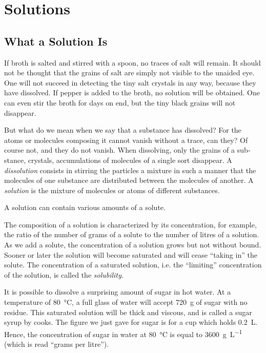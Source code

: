 

\cleardoublepage
\chapter{Solutions}
\label{ch-05}

\section{What a Solution Is}

If broth is salted and stirred with a spoon, no traces of salt will remain. It should not be thought that the grains of salt are simply not visible to the unaided eye. One will not succeed in detecting the tiny salt crystals in any way, because they have dissolved. If pepper is added to the broth, no solution will be obtained. One can even stir the broth for days on end, but the tiny black grains will not disappear.

But what do we mean when we say that a substance has dissolved? For the atoms or molecules composing it cannot vanish without a trace, can they? Of course not, and they do not vanish. When dissolving, only the grains of a sub­stance, crystals, accumulations of molecules of a single sort disappear. A \emph{dissolution} consists in stirring the particles a mixture in such a manner that the molecules of one substance are distributed between the molecules of another. A \emph{solution} is the mixture of molecules or atoms
of different substances.

A solution can contain various amounts of a solute.

The composition of a solution is characterized by its concentration, for example, the ratio of the number of grams of a solute to the number of litres of a solution.
As we add a solute, the concentration of a solution grows but not without bound. Sooner or later the solution will become saturated and will cease ``taking in'' the solute. The concentration of a saturated solution, i.e. the ``limiting'' concentration of the solution, is called the \emph{solubility}.

It is possible to dissolve a surprising amount of sugar in hot water. At a temperature of \SI{80}{\celsius}, a full glass of water will accept \SI{720}{\gram} of sugar with no residue. This saturated solution will be thick and viscous, and is called a sugar syrup by cooks. The figure we just gave for sugar is for a cup which holds \SI{0.2}{\liter}. Hence, the concentration of sugar in water at \SI{80}{\celsius} is equal to \SI{3600}{\gram\per\liter} (which is read ``grams per litre'').

